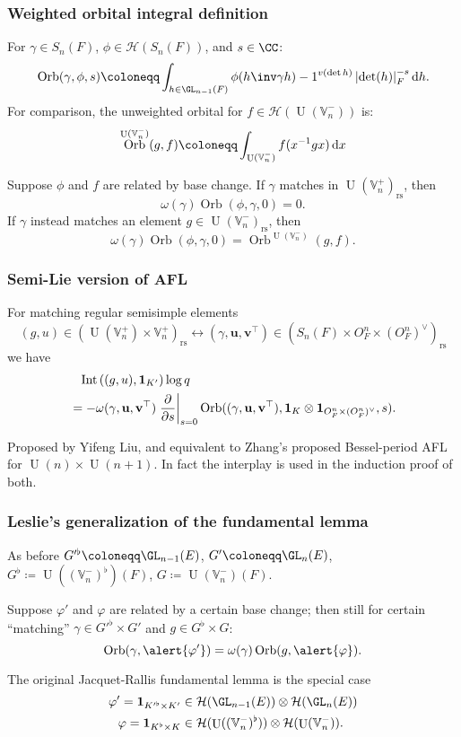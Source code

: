 \documentclass[11pt]{beamer}
\DeclareMathOperator{\Int}{Int}
\DeclareMathOperator{\Orb}{Orb}
\DeclareMathOperator{\U}{U}
\newcommand{\HH}{\mathcal{H}}
\newcommand{\VV}{\mathbb{V}}
\renewcommand{\OO}{O}
\newcommand{\guv}{{(\gamma, \uu, \vv^\top)}}
\newcommand{\rs}{_{\text{rs}}}
\newcommand{\uu}{\mathbf{u}}
\newcommand{\vv}{\mathbf{v}}
\newcommand{\oneV}{\mathbf{1}_{\OO_F^n \times (\OO_F^n)^\vee}}
\begin{document}
\begin{frame}
  \frametitle{Weighted orbital integral definition}
  For $\gamma \in S_n(F)$, $\phi \in \HH(S_n(F))$, and $s \in \CC$:
  \[ \Orb(\gamma, \phi, s) \coloneqq
    \int_{h \in \GL_{n-1}(F)} \phi(h\inv \gamma h) -1^{v(\det h)}
    \left\lvert \det(h) \right\rvert_F^{-s} \odif h. \]
  For comparison, the unweighted orbital for $f \in \HH(\U(\VV_n^-))$ is:
  \[ \Orb^{\U(\VV_n^-)}(g, f) \coloneqq \int_{\U(\VV_n^-)} f(x^{-1}gx) \odif x \]
  \begin{theorem}
    Suppose $\phi$ and $f$ are related by base change.
    If $\gamma$ matches in $\U(\VV_n^+)\rs$, then
    \[ \omega(\gamma) \Orb(\phi, \gamma, 0) = 0. \]
    If $\gamma$ instead matches an element $g \in \U(\VV_n^-)\rs$, then
    \[ \omega(\gamma) \Orb(\phi, \gamma, 0)
      = \Orb^{\U(\VV_n^-)}(g, f). \]
  \end{theorem}
\end{frame}

\begin{frame}
  \frametitle{Semi-Lie version of AFL}
  \begin{theorem}
    For matching regular semisimple elements
    \[ (g, u) \in (\U(\VV_n^+) \times \VV_n^+)\rs \longleftrightarrow
      (\gamma, \uu, \vv^\top) \in (S_n(F) \times \OO_F^n \times (\OO_F^n)^\vee)\rs \]
    we have
    \begin{align*}
      &\phantom= \Int\left( (g,u), \mathbf{1}_{K'} \right) \log q \\
      &= -\omega\guv \left. \pdv{}{s} \right\rvert_{s=0}
      \Orb(\guv, \mathbf{1}_K \otimes \oneV, s).
    \end{align*}
  \end{theorem}
  Proposed by Yifeng Liu,
  and equivalent to Zhang's proposed Bessel-period AFL for $\U(n) \times \U(n+1)$.
  In fact the interplay is used in the induction proof of both.
\end{frame}

\begin{frame}
  \frametitle{Leslie's generalization of the fundamental lemma}
  As before $G'^\flat \coloneqq \GL_{n-1}(E)$, $G' \coloneqq \GL_n(E)$,
  $G^\flat \coloneqq \U((\VV_n^-)^\flat)(F)$, $G \coloneqq \U(\VV_n^-)(F)$.
  \begin{theorem}[Leslie 2023]
    Suppose \alert{$\varphi'$ and $\varphi$ are related by a certain base change}; then still
    for certain ``matching'' $\gamma \in G'^\flat \times G'$ and $g \in G^\flat \times G$:
    \[ \Orb(\gamma, \alert{\varphi'}) = \omega(\gamma) \Orb(g, \alert{\varphi}). \]
  \end{theorem}
  The original Jacquet-Rallis fundamental lemma is the special case
  \begin{align*}
    \varphi' = \mathbf{1}_{K'^\flat \times K'} &\in \HH(\GL_{n-1}(E)) \otimes \HH(\GL_n(E)) \\
    \varphi = \mathbf{1}_{K^\flat \times K} &\in \HH(\U((\VV_n^-)^\flat)) \otimes \HH(\U(\VV_n^-)).
  \end{align*}
\end{frame}
\end{document}
